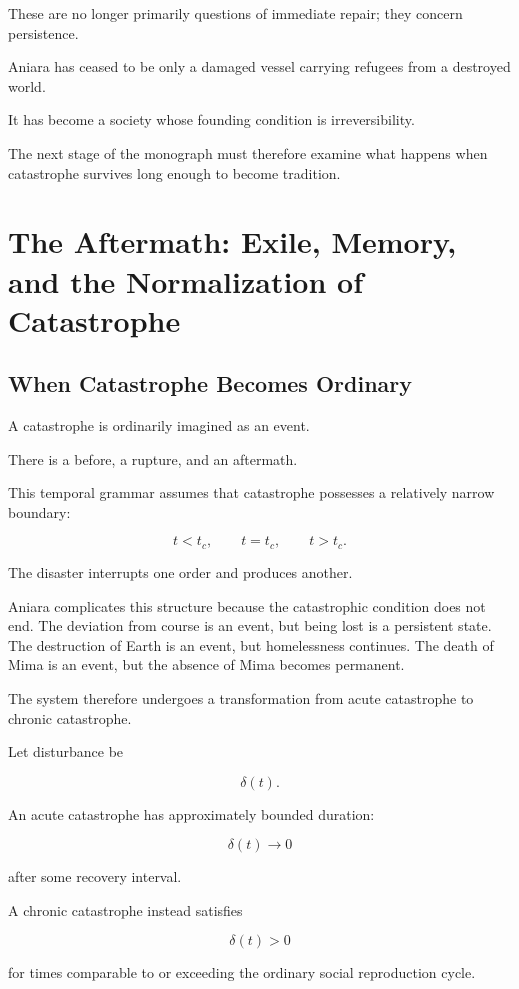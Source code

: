 \documentclass[11pt,oneside]{book}
\theoremstyle{definition}
\theoremstyle{remark}
\begin{document}
These are no longer primarily questions of immediate repair; they concern persistence.

Aniara has ceased to be only a damaged vessel carrying refugees from a destroyed world.

It has become a society whose founding condition is irreversibility.

The next stage of the monograph must therefore examine what happens when catastrophe survives long enough to become tradition.

\chapter{The Aftermath: Exile, Memory, and the Normalization of Catastrophe}

\section{When Catastrophe Becomes Ordinary}

A catastrophe is ordinarily imagined as an event.

There is a before, a rupture, and an aftermath.

This temporal grammar assumes that catastrophe possesses a relatively narrow boundary:

\[
t<t_c,
\qquad
t=t_c,
\qquad
t>t_c.
\]

The disaster interrupts one order and produces another.

Aniara complicates this structure because the catastrophic condition does not end. The deviation from course is an event, but being lost is a persistent state. The destruction of Earth is an event, but homelessness continues. The death of Mima is an event, but the absence of Mima becomes permanent.

The system therefore undergoes a transformation from acute catastrophe to chronic catastrophe.

Let disturbance be

\[
\delta(t).
\]

An acute catastrophe has approximately bounded duration:

\[
\delta(t)\rightarrow0
\]

after some recovery interval.

A chronic catastrophe instead satisfies

\[
\delta(t)>0
\]

for times comparable to or exceeding the ordinary social reproduction cycle.
\end{document}

